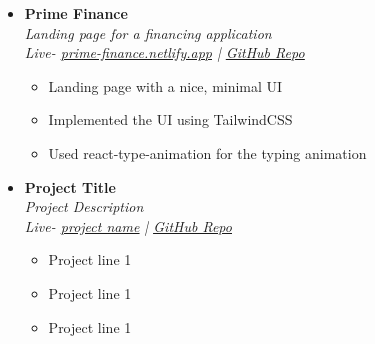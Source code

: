 \documentclass[11pt, oneside, a4paper, titlepage]{article}
\begin{document}
\begin{tcolorbox}
\begin{minipage}[t]{11cm}
\begin{tcolorbox}[grow to right by=0.75cm,colframe=white,colback=white]
\begin{itemize}
        \item
        {
          \textbf{Prime Finance} \\
          \textit{Landing page for a financing application} \\
          \textit{Live- \href{https://prime-finance.netlify.app}{\underline{prime-finance.netlify.app}} | \href{https://github.com/SazedWorldbringer/prime-finance-react}{\underline{GitHub Repo}}} \\
          \vspace*{-0.7cm}
          \begin{itemize}
            \item Landing page with a nice, minimal UI
            \item Implemented the UI using TailwindCSS
            \item Used react-type-animation for the typing animation
          \end{itemize}
        }
        \item
        {
          \textbf{Project Title} \\
          \textit{Project Description} \\
          \textit{Live- \href{url}{\underline{project name}} | \href{https://github.com/SazedWorldbringer}{\underline{GitHub Repo}}} \\
          \vspace*{-0.7cm}
          \begin{itemize}
            \item Project line 1
            \item Project line 1
            \item Project line 1
          \end{itemize}
        }
      \end{itemize}

\end{tcolorbox}
\end{minipage}
\end{tcolorbox}
\end{document}

